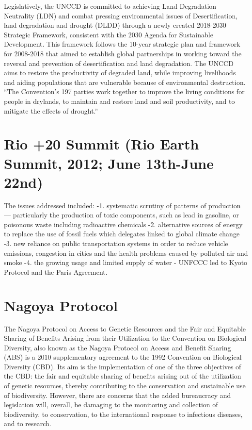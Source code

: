 \documentclass[]{book}
\begin{document}
Legislatively, the UNCCD is committed to achieving Land Degradation Neutrality (LDN) and combat pressing environmental issues of Desertification, land degradation and drought (DLDD) through a newly created 2018-2030 Strategic Framework, consistent with the 2030 Agenda for Sustainable Development. This framework follows the 10-year strategic plan and framework for 2008-2018 that aimed to establish global partnerships in working toward the reversal and prevention of desertification and land degradation. The UNCCD aims to restore the productivity of degraded land, while improving livelihoods and aiding populations that are vulnerable because of environmental destruction. ``The Convention's 197 parties work together to improve the living conditions for people in drylands, to maintain and restore land and soil productivity, and to mitigate the effects of drought.''

\hypertarget{rio-20-summit-rio-earth-summit-2012-june-13th-june-22nd}{%
\section{Rio +20 Summit (Rio Earth Summit, 2012; June 13th-June 22nd)}\label{rio-20-summit-rio-earth-summit-2012-june-13th-june-22nd}}

The issues addressed included:
-1. systematic scrutiny of patterns of production --- particularly the production of toxic components, such as lead in gasoline, or poisonous waste including radioactive chemicals
-2. alternative sources of energy to replace the use of fossil fuels which delegates linked to global climate change
-3. new reliance on public transportation systems in order to reduce vehicle emissions, congestion in cities and the health problems caused by polluted air and smoke
-4. the growing usage and limited supply of water
- UNFCCC led to Kyoto Protocol and the Paris Agreement.

\hypertarget{nagoya-protocol}{%
\section{Nagoya Protocol}\label{nagoya-protocol}}

The Nagoya Protocol on Access to Genetic Resources and the Fair and Equitable Sharing of Benefits Arising from their Utilization to the Convention on Biological Diversity, also known as the Nagoya Protocol on Access and Benefit Sharing (ABS) is a 2010 supplementary agreement to the 1992 Convention on Biological Diversity (CBD). Its aim is the implementation of one of the three objectives of the CBD: the fair and equitable sharing of benefits arising out of the utilization of genetic resources, thereby contributing to the conservation and sustainable use of biodiversity. However, there are concerns that the added bureaucracy and legislation will, overall, be damaging to the monitoring and collection of biodiversity, to conservation, to the international response to infectious diseases, and to research.
\end{document}
